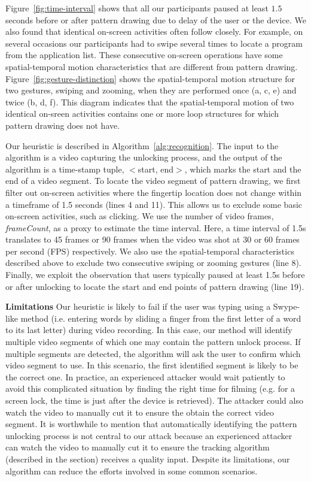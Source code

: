Figure~\ref{fig:time-interval} shows that all our participants paused at least $1.5$ seconds before or after pattern drawing due to delay of the user or the device.
We also found that identical on-screen activities often follow closely. For example, on several occasions our participants had to swipe several times  to locate a program from the application list.
These consecutive on-screen operations have some spatial-temporal motion characteristics that are different from pattern drawing.
Figure~\ref{fig:gesture-distinction} shows the spatial-temporal motion structure for  two gestures, swiping and zooming, when they are performed once (a, c, e) and twice (b, d, f).
This diagram indicates that the spatial-temporal motion of two identical on-sreen activities contains one or more loop structures for which pattern drawing does not have.


Our heuristic is described
in Algorithm~\ref{alg:recognition}. The input to the algorithm is a video capturing the unlocking process, and the output of the
algorithm is a time-stamp tuple, $<$start, end$>$, which marks the start and the end
of a video segment.
To locate the video segment of pattern drawing, we first filter out on-screen activities where the
fingertip location does not change within a timeframe of 1.5 seconds (lines 4 and 11). This
allows us to exclude some basic on-screen activities, such as clicking. We
use the number of video frames, \emph{frameCount}, as a proxy to estimate the time interval. Here, a time
interval of 1.5s translates to 45 frames or 90 frames when the video was shot
at 30 or 60 frames per second (FPS) respectively. We also use the
spatial-temporal characteristics described above to exclude two consecutive swiping or zooming gestures (line 8). Finally, we exploit the observation that users
typically paused at least 1.5s before or after unlocking to locate the start
and end points of pattern drawing (line 19).

\noindent \textbf{Limitations} Our heuristic is likely to fail if the user was typing
using a Swype-like method (i.e. entering words by sliding a finger from
the first letter of a word to its last letter) during video recording. In
this case, our method will identify multiple video segments of which one may contain
the pattern unlock process. If multiple segments are detected, the algorithm will ask the
user to confirm which video segment to use.
In this scenario, the first identified segment is likely to be the correct one.
In practice, an experienced attacker would wait patiently to avoid this
complicated situation by finding the right time for filming (e.g. for a screen
lock, the time is just after the device is retrieved).
The attacker could also watch the video to manually cut it to ensure the obtain the correct video segment.
It is
worthwhile to mention that automatically identifying the pattern unlocking process is
not central to our attack because an experienced attacker can watch the video to manually cut it to ensure the tracking algorithm (described in the section) receives a quality input.
Despite its limitations, our algorithm can reduce the efforts involved in some common scenarios.

